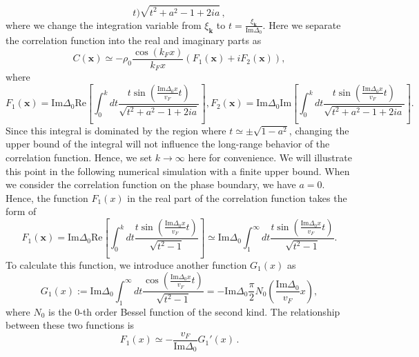 \documentclass[aps,prl,twocolumn,superscriptaddress]{revtex4-1}
\begin{document}
\begin{bibunit}
\begin{equation}
{		t )}{ \sqrt{t^2 +a^2- 1+2ia}}\,,
	\label{eq:Cx_near_boundary}
\end{equation}
where we change the integration variable from $\xi_{\bm{k}}$ to $t=\frac{\xi_{\bm{k}}}{\text{Im}\Delta_0} $. Here we separate the correlation function into the real and imaginary parts as 
\begin{equation}
	C(\bm{x})\simeq-\rho_0 \frac{\cos(k_F x)}{k_Fx}(F_1(\bm{x})+iF_2(\bm{x})),
\end{equation}
where
\begin{equation}
	F_1(\bm{x})=\text{Im}\Delta_0\text{Re}\left[\int_0^{k} dt \frac{t\sin ( \frac{\text{Im}\Delta_0x}{v_F}
		t )}{ \sqrt{t^2 +a^2- 1+2ia}}\right],F_2(\bm{x})=\text{Im}\Delta_0\text{Im}\left[\int_0^{k} dt \frac{t\sin ( \frac{\text{Im}\Delta_0x}{v_F}
		t )}{ \sqrt{t^2 +a^2- 1+2ia}}\right]\label{F_1F_2}.
\end{equation}
Since this integral is dominated by the region where $t\simeq\pm\sqrt{1-a^2}$, changing the upper bound of the integral will not influence the long-range behavior of the correlation function. Hence, we set $k\to\infty$ here for convenience. We will illustrate this point in the following numerical simulation with a finite upper bound.
When we consider the correlation function on the phase boundary, we have $a=0$. Hence, the function $F_1(x)$ in the real part of the correlation function takes the form of
\begin{equation}
	F_1(\bm{x})=\text{Im}\Delta_0\text{Re}\left[\int_0^{k} dt \frac{t\sin ( \frac{\text{Im}\Delta_0x}{v_F}
		t )}{ \sqrt{t^2 - 1}}\right]\simeq\text{Im}\Delta_0\int_1^{\infty} dt \frac{t\sin ( \frac{\text{Im}\Delta_0x}{v_F}
		t )}{ \sqrt{t^2 - 1}}.
	\label{definition_of_F1}
\end{equation}
To calculate this function, we introduce another function $G_1(x)$ as
\begin{equation}
	G_1 (x) := \text{Im}
	\Delta_0\int_1^{\infty} dt \frac{\cos ( \frac{\text{Im}\Delta_0x}{v_F}
		t )}{ \sqrt{t^2 - 1}}=-\text{Im}\Delta_0\frac{\pi}{2} N_0 \left( \frac{\text{Im} \Delta_0}{v_F} x \right),
\end{equation}
where $N_0$ is the 0-th order Bessel function of the second kind. The relationship between these two functions is 
\begin{equation}
	F_1 (x) \simeq - \frac{v_F}{\text{Im}\Delta_0} G_1' (x)\,.
\end{equation}

\end{bibunit}
\end{document}
